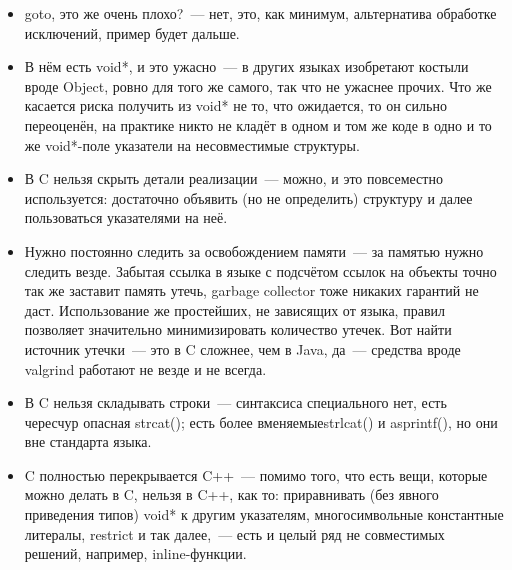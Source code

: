 \documentclass[10pt, a5paper]{article}
\begin{document}
\begin{itemize}
  \item goto, это же очень плохо?~--- нет, это, как минимум, альтернатива обработке исключений, пример будет дальше.
\end{itemize}

\begin{itemize}
  \item В нём есть void*, и это ужасно~--- в других языках изобретают костыли вроде Object, ровно для того же самого, так что не ужаснее прочих. Что же касается риска получить из void* не то, что ожидается, то он сильно переоценён, на практике никто не кладёт в одном и том же коде в одно и то же void*-поле указатели на несовместимые структуры.
\end{itemize}

\begin{itemize}
  \item В C нельзя скрыть детали реализации~--- можно, и это повсеместно используется: достаточно объявить (но не определить) структуру и далее пользоваться указателями на неё.
\end{itemize}

\begin{itemize}
  \item Нужно постоянно следить за освобождением памяти~--- за памятью нужно следить везде. Забытая ссылка в языке с подсчётом ссылок на объекты точно так же заставит память утечь, garbage collector тоже никаких гарантий не даст. Использование же простейших, не зависящих от языка, правил позволяет значительно минимизировать количество утечек. Вот найти источник утечки~--- это в C сложнее, чем в Java, да~--- средства вроде valgrind работают не везде и не всегда.
\end{itemize}

\begin{itemize}
  \item В C нельзя складывать строки~--- синтаксиса специального нет, есть чересчур опасная strcat(); есть более вменяемые\linebreak strlcat() и asprintf(), но они вне стандарта языка.
\end{itemize}

\begin{itemize}
  \item C полностью перекрывается C++~--- помимо того, что есть вещи, которые можно делать в C, нельзя в C++, как то: приравнивать (без явного приведения типов) void* к другим указателям, многосимвольные константные литералы, restrict и так далее,~--- есть и целый ряд не совместимых решений, например, inline-функции.
\end{itemize}
\end{document}
